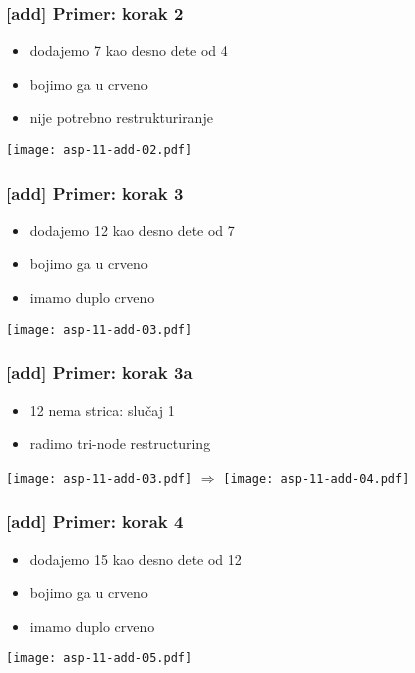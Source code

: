 \documentclass[compress,aspectratio=169]{beamer}
\begin{document}
\begin{frame}[fragile]
  \frametitle{[add] Primer: korak 2}
  \begin{itemize}
    \item dodajemo 7 kao desno dete od 4
    \item bojimo ga u crveno
    \item nije potrebno restrukturiranje
  \end{itemize}
  \begin{center}
    \texttt{[image: asp-11-add-02.pdf]}
  \end{center}
\end{frame}

\begin{frame}[fragile]
  \frametitle{[add] Primer: korak 3}
  \begin{itemize}
    \item dodajemo 12 kao desno dete od 7
    \item bojimo ga u crveno
    \item imamo duplo crveno
  \end{itemize}
  \begin{center}
    \texttt{[image: asp-11-add-03.pdf]}
  \end{center}
\end{frame}

\begin{frame}[fragile]
  \frametitle{[add] Primer: korak 3a}
  \begin{itemize}
    \item 12 nema strica: slučaj 1
    \item radimo tri-node restructuring
  \end{itemize}
  \begin{center}
    \texttt{[image: asp-11-add-03.pdf]} $\Rightarrow$
    \texttt{[image: asp-11-add-04.pdf]}
  \end{center}
\end{frame}

\begin{frame}[fragile]
  \frametitle{[add] Primer: korak 4}
  \begin{itemize}
    \item dodajemo 15 kao desno dete od 12
    \item bojimo ga u crveno
    \item imamo duplo crveno
  \end{itemize}
  \begin{center}
    \texttt{[image: asp-11-add-05.pdf]}
  \end{center}
\end{frame}
\end{document}
